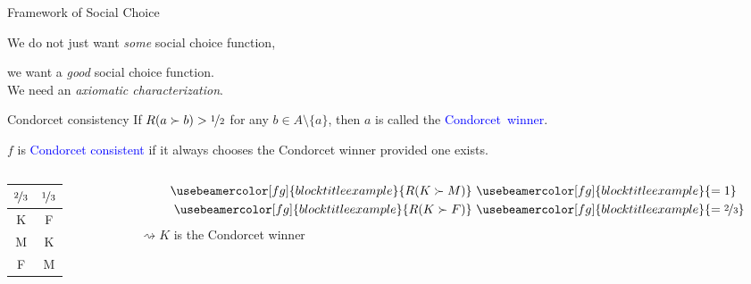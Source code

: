 \documentclass{beamer}
\theoremstyle{definition}
\def\b{\textcolor{blue}}
\def\g#1{{\usebeamercolor[fg]{block title example}{#1}}}
\begin{document}
\begin{frame}{Framework of Social Choice}
\begin{center}
We do not just want \emph{some} social choice function,\par
we want a \emph{good} social choice function.\pause \\[10pt]
We need an \emph{axiomatic characterization}.
\end{center}\pause

\begin{block}{Condorcet consistency}
If $R(a \succ b) > \nicefrac{1}{2}$ for any $b \in A \setminus \{a\}$\pause, then $a$ is called the \b{Condorcet~winner}.\par\pause
$f$ is \b{Condorcet consistent} if it always chooses the Condorcet winner provided one exists.
\end{block}\pause

\begin{example}
\begin{columns}
\begin{column}{0.5\textwidth}
\begin{center}\begin{tabular}{ c|c } 
 $\nicefrac{2}{3}$ & $\nicefrac{1}{3}$ \\ 
 \hline\hline
 K & F \\ 
 M & K \\ 
 F & M \\
\end{tabular}\end{center}
\end{column}\pause
\begin{column}{0.5\textwidth}
\begin{align*}
    \g{R(K \succ M)}\ &\g{= 1} \\
    \g{R(K \succ F)}\ &\g{= \nicefrac{2}{3}}
\end{align*}
$\rightsquigarrow K$ is the Condorcet winner
\end{column}
\end{columns}
\end{example}


\end{frame}
\end{document}
